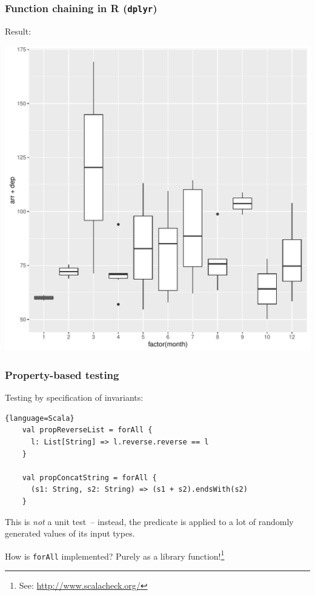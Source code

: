 \documentclass{beamer}
\begin{document}
\begin{frame}[containsverbatim]
  \frametitle{Function chaining in R (\texttt{dplyr})} 
  Result:
  \begin{center}
    \includegraphics[height=0.7\textheight]{fig/plot}
  \end{center}
\end{frame}



\begin{frame}[containsverbatim]
  \frametitle{Property-based testing} 

  Testing by specification of invariants:

  \begin{lstlisting}{language=Scala}
    val propReverseList = forAll {
      l: List[String] => l.reverse.reverse == l
    }

    val propConcatString = forAll {
      (s1: String, s2: String) => (s1 + s2).endsWith(s2)
    }
  \end{lstlisting}

  This is \textit{not} a unit test~-- instead, the predicate is applied to a lot of randomly
  generated values of its input types.

  How is \lstinline|forAll| implemented? Purely as a library
  function!\footnote{See: \protect\url{http://www.scalacheck.org/}}
\end{frame}
\end{document}
